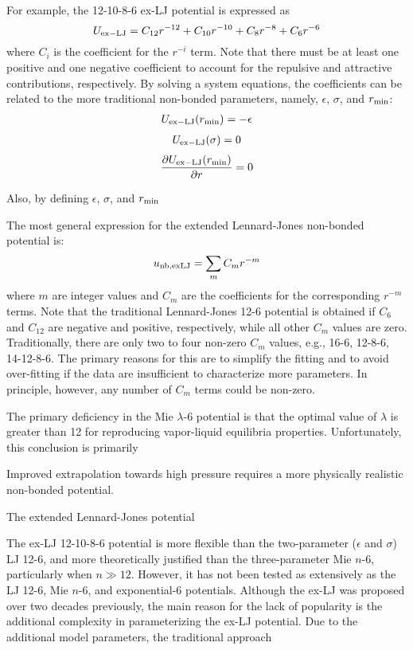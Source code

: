 \documentclass[11pt,a4paper]{article}
\begin{document}
For example, the 12-10-8-6 ex-LJ potential is expressed as 
\begin{equation}
U_{\rm ex-LJ} = C_{12} r^{-12} + C_{10} r^{-10} + C_{8} r^{-8} + C_{6} r^{-6}
\end{equation}
where $C_{i}$ is the coefficient for the $r^{-i}$ term. Note that there must be at least one positive and one negative coefficient to account for the repulsive and attractive contributions, respectively. By solving a system equations, the coefficients can be related to the more traditional non-bonded parameters, namely, $\epsilon$, $\sigma$, and $r_{\rm min}$:
\begin{eqnarray}
U_{\rm ex-LJ}(r_{\rm min}) = -\epsilon
\end{eqnarray}
\begin{eqnarray}
U_{\rm ex-LJ}(\sigma) = 0
\end{eqnarray}
\begin{eqnarray}
\frac{\partial U_{\rm ex-LJ}(r_{\rm min})}{\partial r} = 0
\end{eqnarray}

Also, by defining $\epsilon$, $\sigma$, and $r_{\rm min}$

The most general expression for the extended Lennard-Jones non-bonded potential is:
\begin{equation} \label{ex-LJ general}
u_{\rm nb, exLJ} = \sum_m C_m r^{-m} 
\end{equation} 
where $m$ are integer values and $C_m$ are the coefficients for the corresponding $r^{-m}$ terms. Note that the traditional Lennard-Jones 12-6 potential is obtained if $C_6$ and $C_{12}$ are negative and positive, respectively, while all other $C_m$ values are zero. Traditionally, there are only two to four non-zero $C_m$ values, e.g., 16-6, 12-8-6, 14-12-8-6. The primary reasons for this are to simplify the fitting and to avoid over-fitting if the data are insufficient to characterize more parameters. In principle, however, any number of $C_m$ terms could be non-zero. 

The primary deficiency in the Mie $\lambda$-6 potential is that the optimal value of $\lambda$ is greater than 12 for reproducing vapor-liquid equilibria properties. Unfortunately, this conclusion is primarily  

Improved extrapolation towards high pressure requires a more physically realistic non-bonded potential. 

The extended Lennard-Jones potential 

The ex-LJ 12-10-8-6 potential is more flexible than the two-parameter ($\epsilon$ and $\sigma$) LJ 12-6, and more theoretically justified than the three-parameter Mie $n$-6, particularly when $n \gg 12$. However, it has not been tested as extensively as the LJ 12-6, Mie $n$-6, and exponential-6 potentials. Although the ex-LJ was proposed over two decades previously, the main reason for the lack of popularity is the additional complexity in parameterizing the ex-LJ potential. Due to the additional model parameters, the traditional approach
\end{document}
